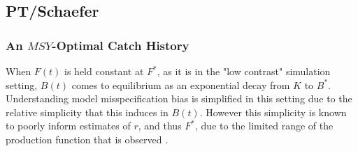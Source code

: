 \documentclass[12pt]{article}
\begin{document}
%
\subsection{PT/Schaefer}

%
\subsubsection{An $MSY$-Optimal Catch History \label{flat}}

%
When $F(t)$ is held constant at $F^*$, as it is in the "low contrast" 
simulation setting, $B(t)$ comes to equilibrium as an exponential decay from 
$K$ to $B^*$. Understanding model misspecification bias is simplified in this 
setting due to the relative simplicity that this induces in $B(t)$. However 
this simplicity is known to poorly inform estimates of $r$, and thus $F^*$, 
due to the limited range of the production function that is observed 
. 

\end{document}
